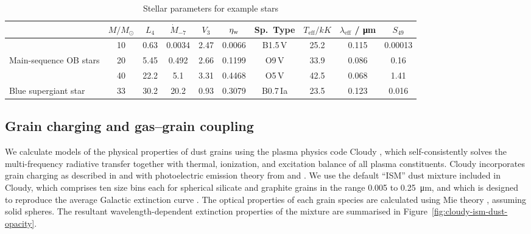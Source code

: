 \begin{table}
  \centering
  \caption{Stellar parameters for example stars}
  \label{tab:stars}
  \begin{tabular}{l S S S S S S S S S}
    \toprule
    & {\(M / \si{M_\odot}\)} & {\(L_4\)}
    & {\(\dot{M}_{-7}\)} & {\(V_3\)} & {\( \eta_{\text{w}} \)}
    & {Sp.~Type} 
    & {\(T_{\text{eff}} / \si{kK}\)} & {\(\lambda_{\text{eff}}\) / \si{\um}}
    & {\(S_{49}\)} 
    \\
    \midrule
    & 10 & 0.63 & 0.0034 & 2.47 & 0.0066 & {B1.5\,V} & 25.2 & 0.115 & 0.00013
                   \\
    Main-sequence OB stars
    & 20 & 5.45 & 0.492 & 2.66 & 0.1199 & {O9\,V} & 33.9 & 0.086 & 0.16
                    \\
    & 40 & 22.2 & 5.1 & 3.31 & 0.4468 & {O5\,V} & 42.5 & 0.068 & 1.41
                   \\[\smallskipamount]
    Blue supergiant star
    & 33 & 30.2 & 20.2 & 0.93 & 0.3079 & {B0.7\,Ia} & 23.5 & 0.123 & 0.016
                   \\
    \bottomrule
  \end{tabular}
\end{table}

\subsection{Grain charging and gas--grain coupling}
\label{sec:cloudy-models-dust}

We calculate models of the physical properties of dust grains using
the plasma physics code Cloudy \citep{Ferland:2013a, Ferland:2017a},
which self-consistently solves the multi-frequency radiative transfer
together with thermal, ionization, and excitation balance of all
plasma constituents.  Cloudy incorporates grain charging as described
in \citet{Baldwin:1991a} and \citet{van-Hoof:2004a} with photoelectric
emission theory from \citet{Weingartner:2001b} and
\citet{Weingartner:2006a}.  We use the default ``ISM'' dust mixture
included in Cloudy, which comprises ten size bins each for spherical
silicate and graphite grains in the range \num{0.005} to
\SI{0.25}{\um}, and which is designed to reproduce the average
Galactic extinction curve \citep{Weingartner:2001a, Abel:2008a}.  The
optical properties of each grain species are calculated using Mie
theory \citep{Bohren:1983a}, assuming solid spheres.  The resultant
wavelength-dependent extinction properties of the mixture are
summarised in Figure~\ref{fig:cloudy-ism-dust-opacity}.


